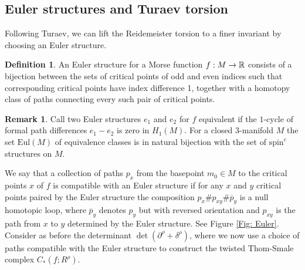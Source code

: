 \documentclass[11pt]{article}
\numberwithin{equation}{section}\providecommand{\dpl}{\displaystyle}
\newcommand{\Eul}{\mathrm{Eul}}
\newcommand{\spin}{\mathrm{spin}}
\theoremstyle{plain}
\theoremstyle{definition}
\newtheorem{definition}[theorem]{Definition}
\newtheorem{remark}[theorem]{Remark}
\begin{document}
\subsection{Euler structures and Turaev torsion}
Following Turaev, we can lift the Reidemeister torsion to a finer invariant by choosing an Euler structure.

\begin{definition} An Euler structure for a Morse function $f:M \to \mathbb{R}$ consists of a bijection between the sets of critical points of odd and even indices such that corresponding critical points have index difference 1, together with a homotopy class of paths connecting every such pair of critical points.
\end{definition}

\begin{remark}
Call two Euler structures $e_1$ and $e_2$ for $f$ equivalent if the $1$-cycle of formal path differences $e_1-e_2$ is zero in $H_1(M)$. For a closed 3-manifold $M$ the set $\Eul(M)$ of equivalence classes is in natural bijection with the set of $\spin^c$ structures on $M$.
\end{remark}

We say that a collection of paths $p_x$ from the basepoint $m_0\in M$ to the critical points $x$ of $f$ is compatible with an Euler structure if for any $x$ and $y$ critical points paired by the Euler structure the composition $p_x \# p_{xy} \# \overline{p}_y $ is a null homotopic loop, where $\overline{p}_y$ denotes $p_y$ but with reversed orientation and $p_{xy}$ is the path from $x$ to $y$ determined by the Euler structure. See Figure \ref{Fig: Euler}. Consider as before the determinant $\det(\partial^\rho + \delta^\rho)$, where we now use a choice of paths compatible with the Euler structure to construct the twisted Thom-Smale complex $C_*(f; R^\rho)$.
\end{document}
